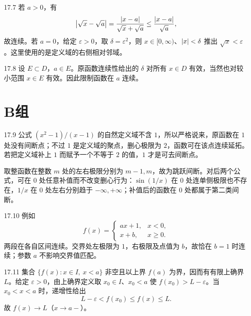 \begin{solution}{17.7}
若 \(a>0\)，有
\[
 \left|\sqrt x-\sqrt a\right|
 =\frac{\left|x-a\right|}{\sqrt x+\sqrt a}
 \le\frac{\left|x-a\right|}{\sqrt a},
\]
故连续。若 \(a=0\)，给定 \(\varepsilon>0\)，取 \(\delta=\varepsilon^2\)，则 \(x\in[0,\infty)\)、\(\left|x\right|<\delta\) 推出 \(\sqrt x<\varepsilon\)。这里使用的是定义域的右侧相对邻域。
\end{solution}

\begin{solution}{17.8}
设 \(E\subset D\)，\(a\in E\)。原函数连续性给出的 \(\delta\) 对所有 \(x\in D\) 有效，当然也对较小范围 \(x\in E\) 有效。因此限制函数在 \(a\) 连续。
\end{solution}

\section*{B组}

\begin{solution}{17.9}
公式 \((x^2-1)/(x-1)\) 的自然定义域不含 \(1\)，所以严格说来，原函数在 \(1\) 处没有间断点；不过 \(1\) 是定义域的聚点，删心极限为 \(2\)，函数可在该点连续延拓。若把定义域补上 \(1\) 而赋予一个不等于 \(2\) 的值，\(1\) 才是可去间断点。

取整函数在整数 \(m\) 处的左右极限分别为 \(m-1,m\)，故为跳跃间断。对后两个公式，可在 \(0\) 处任意补值而不改变删心行为：\(\sin(1/x)\) 在 \(0\) 处连单侧极限也不存在，\(1/x\) 在 \(0\) 处左右分别趋于 \(-\infty,+\infty\)；补值后的函数在 \(0\) 处都属于第二类间断。
\end{solution}

\begin{solution}{17.10}
例如
\[
 f(x)=
 \begin{cases}
 ax+1,&x<0,\\
 x+b,&x\ge0.
 \end{cases}
\]
两段在各自区间连续。交界处左极限为 \(1\)，右极限及点值为 \(b\)，故恰在 \(b=1\) 时连续；参数 \(a\) 不影响交界值匹配。
\end{solution}

\begin{solution}{17.11}
集合 \(\{f(x):x\in I,\ x<a\}\) 非空且以上界 \(f(a)\) 为界，因而有有限上确界 \(L\)。给定 \(\varepsilon>0\)，由上确界定义取 \(x_0\in I\)、\(x_0<a\) 使 \(f(x_0)>L-\varepsilon\)。当 \(x_0<x<a\) 时，递增性给出
\[
 L-\varepsilon<f(x_0)\le f(x)\le L.
\]
故 \(f(x)\to L\)（\(x\to a-\)）。
\end{solution}

